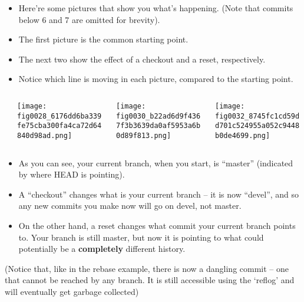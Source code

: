 \documentclass[presentation]{beamer}
\begin{document}
\begin{frame}

\small
\begin{itemize}
\item Here're some pictures that show you what's happening.  (Note that
  commits below 6 and 7 are omitted for brevity).
\item The first picture is the common starting point.
\item The next two show the effect of a checkout and a reset, respectively.
\item Notice which line is moving in each picture, compared to the starting point.
\end{itemize}
\begin{columns} %
\label{sec-9-2-1}
\begin{column}{0.3\textwidth}
\label{sec-9-2-1-1}



\texttt{[image: fig0028\_6176dd6ba339fe75cba300fa4ca72d64840d98ad.png]}
\end{column}
\begin{column}{0.3\textwidth}
\label{sec-9-2-1-2}



\texttt{[image: fig0030\_b22ad6d9f4367f3b3639da0af5953a6b0d89f813.png]}
\end{column}
\begin{column}{0.3\textwidth}
\label{sec-9-2-1-3}



\texttt{[image: fig0032\_8745fc1cd59dd701c524955a052c9448b0de4699.png]}
\end{column}
\end{columns}
\end{frame}
\begin{frame}

\begin{itemize}
\item As you can see, your current branch, when you start, is ``master'' (indicated by
  where HEAD is pointing).
\item A ``checkout'' changes what is your current branch -- it is now ``devel'', and so
  any new commits you make now will go on devel, not master.
\item On the other hand, a reset changes what commit your current branch points to.
  Your branch is still master, but now it is pointing to what could potentially
  be a \textbf{completely} different history.
\end{itemize}

\small
(Notice that, like in the rebase example, there is now a dangling commit --
one that cannot be reached by any branch.  It is still accessible using the
`reflog' and will eventually get garbage collected)
\end{frame}
\end{document}
